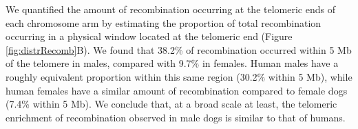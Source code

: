 We quantified the amount of recombination occurring at the telomeric ends of each chromosome arm by estimating the proportion of total recombination occurring in a physical window located at the telomeric end (Figure \ref{fig:distrRecomb}B).
We found that 38.2\% of recombination occurred within 5 Mb of the telomere in males, compared with 9.7\% in females.
Human males have a roughly equivalent proportion within this same region (30.2\% within 5 Mb), while human females have a similar amount of recombination compared to female dogs (7.4\% within 5 Mb).
We conclude that, at a broad scale at least, the telomeric enrichment of recombination observed in male dogs is similar to that of humans.

